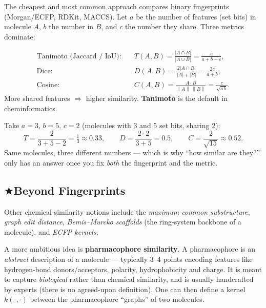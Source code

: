 \documentclass[11pt, oneside]{book}
\makeatletter
\newcommand{\starglyph}{\textcolor{stargold}{\ensuremath{\bigstar}}}
\newcommand{\starsec}[1]{%
  \texorpdfstring{\starglyph\hspace{0.4em}\textcolor{star@frame}{#1}}{#1}}
\newcommand{\norm}[1]{\left\lVert #1 \right\rVert}
\makeatother
\begin{document}
The cheapest and most common approach compares binary fingerprints (Morgan/ECFP,
RDKit, MACCS). Let $a$ be the number of features (set bits) in molecule $A$, $b$
the number in $B$, and $c$ the number they share. Three metrics dominate:

\begin{thmbox}[title={Fingerprint similarity coefficients}]
\begin{align*}
\text{Tanimoto (Jaccard / IoU):}\quad
  & T(A,B) = \frac{|A\cap B|}{|A\cup B|} = \frac{c}{a+b-c},\\[2pt]
\text{Dice:}\quad
  & D(A,B) = \frac{2|A\cap B|}{|A|+|B|} = \frac{2c}{a+b},\\[2pt]
\text{Cosine:}\quad
  & C(A,B) = \frac{A\cdot B}{\norm{A}\,\norm{B}} = \frac{c}{\sqrt{a\,b}}.
\end{align*}
More shared features $\Rightarrow$ higher similarity. \textbf{Tanimoto} is the
default in cheminformatics.
\end{thmbox}

\begin{exbox}[title={Computing all three}]
Take $a = 3$, $b = 5$, $c = 2$ (molecules with 3 and 5 set bits, sharing 2):
\[
  T = \frac{2}{3+5-2} = \tfrac{1}{3} \approx 0.33,\qquad
  D = \frac{2\cdot 2}{3+5} = 0.5,\qquad
  C = \frac{2}{\sqrt{15}} \approx 0.52 .
\]
Same molecules, three different numbers --- which is why ``how similar are they?''
only has an answer once you fix \emph{both} the fingerprint and the metric.
\end{exbox}

\subsection{\starsec{Beyond Fingerprints}}

Other chemical-similarity notions include the \emph{maximum common substructure},
\emph{graph edit distance}, \emph{Bemis--Murcko scaffolds} (the ring-system
backbone of a molecule), and \emph{ECFP kernels}.

A more ambitious idea is \textbf{pharmacophore similarity}. A pharmacophore is an
\emph{abstract} description of a molecule --- typically 3--4 points encoding
features like hydrogen-bond donors/acceptors, polarity, hydrophobicity and charge.
It is meant to capture \emph{biological} rather than chemical similarity, and is
usually handcrafted by experts (there is no agreed-upon definition). One can then
define a kernel $k(\cdot,\cdot)$ between the pharmacophore ``graphs'' of two
molecules.
\end{document}
